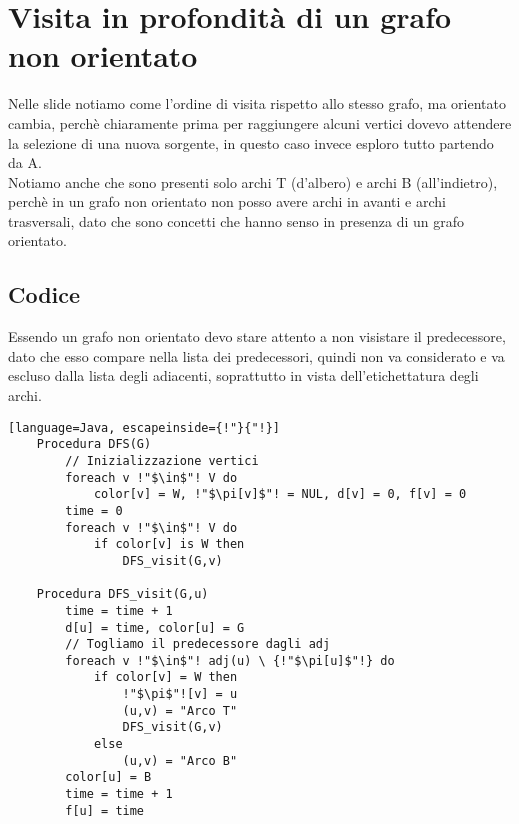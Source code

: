 \section{Visita in profondità di un grafo non orientato}
Nelle slide notiamo come l'ordine di visita rispetto allo stesso grafo, ma orientato
cambia, perchè chiaramente prima per raggiungere alcuni vertici dovevo attendere la selezione
di una nuova sorgente, in questo caso invece esploro tutto partendo da A.\\
Notiamo anche che sono presenti solo archi T (d'albero) e archi B (all'indietro), perchè
in un grafo non orientato non posso avere archi in avanti e archi trasversali, dato che sono
concetti che hanno senso in presenza di un grafo orientato.
\subsection{Codice}
Essendo un grafo non orientato devo stare attento a non visistare il predecessore, dato che
esso compare nella lista dei predecessori, quindi non va considerato e va escluso dalla lista
degli adiacenti, soprattutto in vista dell'etichettatura degli archi.
\begin{lstlisting}[language=Java, escapeinside={!"}{"!}]
    Procedura DFS(G)
        // Inizializzazione vertici
        foreach v !"$\in$"! V do
            color[v] = W, !"$\pi[v]$"! = NUL, d[v] = 0, f[v] = 0
        time = 0
        foreach v !"$\in$"! V do
            if color[v] is W then
                DFS_visit(G,v)

    Procedura DFS_visit(G,u)
        time = time + 1
        d[u] = time, color[u] = G
        // Togliamo il predecessore dagli adj
        foreach v !"$\in$"! adj(u) \ {!"$\pi[u]$"!} do
            if color[v] = W then
                !"$\pi$"![v] = u
                (u,v) = "Arco T"
                DFS_visit(G,v)
            else
                (u,v) = "Arco B" 
        color[u] = B
        time = time + 1
        f[u] = time
\end{lstlisting}
